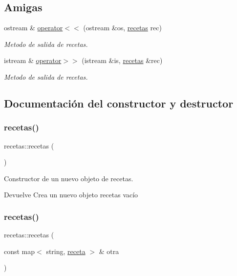 \subsection*{Amigas}
\begin{DoxyCompactItemize}
\item 
ostream \& \hyperlink{classrecetas_a6d22e5920fcf4c27d4bc01fc88c6bd84}{operator$<$$<$} (ostream \&os, \hyperlink{classrecetas}{recetas} rec)
\begin{DoxyCompactList}\small\item\em Metodo de salida de recetas. \end{DoxyCompactList}\item 
istream \& \hyperlink{classrecetas_ad812452076c1f84b23969bc5983e0977}{operator$>$$>$} (istream \&is, \hyperlink{classrecetas}{recetas} \&rec)
\begin{DoxyCompactList}\small\item\em Metodo de salida de recetas. \end{DoxyCompactList}\end{DoxyCompactItemize}


\subsection{Documentación del constructor y destructor}
\mbox{\label{classrecetas_a464457ebc9cd2b5606c1eab9fcafe87c}} 
\subsubsection{\texorpdfstring{recetas()}{recetas()}\hspace{0.1cm}{\footnotesize\ttfamily [1/3]}}
{\footnotesize\ttfamily recetas\+::recetas (\begin{DoxyParamCaption}{ }\end{DoxyParamCaption})}



Constructor de un nuevo objeto de recetas. 

\begin{DoxyReturn}{Devuelve}
Crea un nuevo objeto recetas vacío 
\end{DoxyReturn}
\mbox{\label{classrecetas_ac59d36c24e824aa0a00d888466fecc06}} 
\subsubsection{\texorpdfstring{recetas()}{recetas()}\hspace{0.1cm}{\footnotesize\ttfamily [2/3]}}
{\footnotesize\ttfamily recetas\+::recetas (\begin{DoxyParamCaption}\item[{const map$<$ string, \hyperlink{classreceta}{receta} $>$ \&}]{otra }\end{DoxyParamCaption})}



